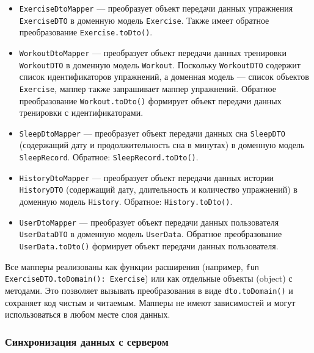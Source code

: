 \begin{itemize}
    \item \texttt{ExerciseDtoMapper} — преобразует объект передачи данных упражнения \texttt{ExerciseDTO} в доменную модель \texttt{Exercise}. Также имеет обратное преобразование \texttt{Exercise.toDto()}.

    \item \texttt{WorkoutDtoMapper} — преобразует объект передачи данных тренировки \texttt{WorkoutDTO} в доменную модель \texttt{Workout}. Поскольку \texttt{WorkoutDTO} содержит список идентификаторов упражнений, а доменная модель — список объектов \texttt{Exercise}, маппер также запрашивает маппер упражнений. Обратное преобразование \texttt{Workout.toDto()} формирует объект передачи данных тренировки с идентификаторами.

    \item \texttt{SleepDtoMapper} — преобразует объект передачи данных сна \texttt{SleepDTO} (содержащий дату и продолжительность сна в минутах) в доменную модель \texttt{SleepRecord}. Обратное: \texttt{SleepRecord.toDto()}.

    \item \texttt{HistoryDtoMapper} — преобразует объект передачи данных истории \texttt{HistoryDTO} (содержащий дату, длительность и количество упражнений) в доменную модель \texttt{History}. Обратное: \texttt{History.toDto()}.

    \item \texttt{UserDtoMapper} — преобразует объект передачи данных пользователя \texttt{UserDataDTO} в доменную модель \texttt{UserData}. Обратное преобразование \texttt{UserData.toDto()} формирует объект передачи данных пользователя.
\end{itemize}

Все мапперы реализованы как функции расширения (например, \texttt{fun ExerciseDTO.toDomain(): Exercise}) или как отдельные объекты (object) с методами. Это позволяет вызывать преобразования в виде \texttt{dto.toDomain()} и сохраняет код чистым и читаемым. Мапперы не имеют зависимостей и могут использоваться в любом месте слоя данных.

\subsubsection{Синхронизация данных с сервером}

